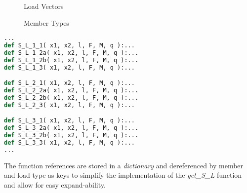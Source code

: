 \begin{figure}[h]%
    \centering
    \qquad

    \centering
    
    \caption{Load Vectors}%
    \label{fig:loadVec}%
\end{figure}


\begin{figure}[h]%
    \centering
    \qquad

    \centering
    \qquad
    
    \caption{Member Types}%
    \label{fig:memberTypes}%
\end{figure}

\begin{inconsolata}
\begin{minipage}{\linewidth}
\begin{lstlisting}[language=python]
...
def S_L_1_1( x1, x2, l, F, M, q ):...
def S_L_1_2a( x1, x2, l, F, M, q ):...
def S_L_1_2b( x1, x2, l, F, M, q ):...
def S_L_1_3( x1, x2, l, F, M, q ):...

def S_L_2_1( x1, x2, l, F, M, q ):...
def S_L_2_2a( x1, x2, l, F, M, q ):...
def S_L_2_2b( x1, x2, l, F, M, q ):...
def S_L_2_3( x1, x2, l, F, M, q ):...

def S_L_3_1( x1, x2, l, F, M, q ):...
def S_L_3_2a( x1, x2, l, F, M, q ):...
def S_L_3_2b( x1, x2, l, F, M, q ):...
def S_L_3_3( x1, x2, l, F, M, q ):...
...
\end{lstlisting}
\end{minipage}
\end{inconsolata}

The function references are stored in a \textit{dictionary} and dereferenced by member and load type as keys to simplify the implementation of the \textit{get\_S\_L} function and allow for easy expand-ability.


